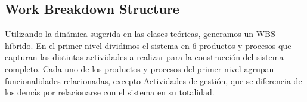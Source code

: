 \renewcommand{\labelitemi}{$\tiny \blacksquare$}



\subsection{Work Breakdown Structure} 

Utilizando la dinámica sugerida en las clases teóricas, generamos un WBS híbrido. En el primer nivel dividimos el sistema en 6 productos y procesos que capturan las distintas actividades a realizar para la construcción del sistema completo. Cada uno de los productos y procesos del primer nivel agrupan funcionalidades relacionadas, excepto Actividades de gestión, que se diferencia de los demás por relacionarse con el sistema en su totalidad.

